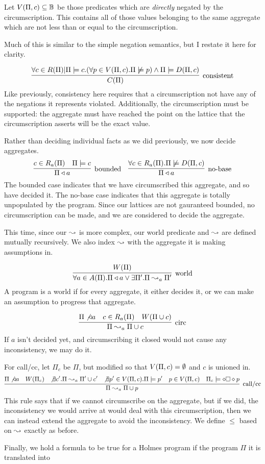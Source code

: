 Let $V(\Pi, c) \subseteq \mathbb{B}$ be those predicates which are \emph{directly} negated by the circumscription.
This contains all of those values belonging to the same aggregate which are not less than or equal to the circumscription.


Much of this is similar to the simple negation semantics, but I restate it here for clarity.

\[
	\infer[\textrm{consistent}]{\cons{\Pi}}{\forall c \in \circset(\Pi) | \Pi \models c. (\forall p \in \viol{\Pi}{c}. \Pi \not \models p) \wedge \Pi \models \decirc{\Pi}{c}}
\]
Like previously, consistency here requires that a circumscription not have any of the negations it represents violated.
Additionally, the circumscription must be supported: the aggregate must have reached the point on the lattice that the circumscription asserts will be the exact value.

Rather than deciding individual facts as we did previously, we now decide aggregates.
\[
	\infer[\textrm{bounded}]{\Pi \decides a}{c \in \circset_a(\Pi) & \Pi \models c}
	\quad
	\infer[\textrm{no-base}]{\Pi \decides a}{\forall c \in \circset_a(\Pi). \Pi \not \models \decirc{\Pi}{c}}
\]
The bounded case indicates that we have circumscribed this aggregate, and so have decided it.
The no-base case indicates that this aggregate is totally unpopulated by the program.
Since our lattices are not gauranteed bounded, no circumscription can be made, and we are considered to decide the aggregate.

This time, since our $\leadsto$ is more complex, our world predicate and $\leadsto$ are defined mutually recursively.
We also index $\leadsto$ with the aggregate it is making assumptions in.

\[
	\infer[\textrm{world}]{\forall a \in \aggset(\Pi). \Pi \decides a \vee \exists \Pi'. \Pi \stepass_a \Pi'}{\world{\Pi}}
\]
A program is a world if for every aggregate, it either decides it, or we can make an assumption to progress that aggregate.

\[
	\infer[\textrm{circ}]{\Pi \stepass_a \Pi \cup c}{\Pi \not \decides a & c \in \circset_a(\Pi) & W(\Pi \cup c)}
\]
If $a$ isn't decided yet, and circumscribing it closed would not cause any inconsistency, we may do it.

For call/cc, let $\Pi_c$ be $\Pi$, but modified so that $V(\Pi, c) = \emptyset$ and $c$ is unioned in.
\[\small
	\infer[\textrm{call/cc}]{\Pi \stepass_a \Pi \cup p}{\Pi \not \decides a & \world{\Pi_c} & \not \exists c'. \Pi \stepass_a \Pi' \cup c' & \not \exists p' \in \viol{\Pi}{c}. \Pi \models p' & p \in \viol{\Pi}{c} & \Pi_c \models \dia \boks \dia p}
\]
This rule says that if we cannot circumscribe on the aggregate, but if we did, the inconsistency we would arrive at would deal with this circumscription, then we can instead extend the aggregate to avoid the inconsistency.
We define $\leq$ based on $\leadsto$ exactly as before.

Finally, we hold a formula to be true for a Holmes program if the program $\Pi$ it is translated into
